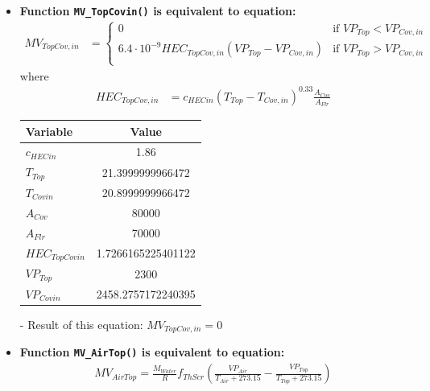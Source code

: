 \documentclass[a4paper]{article}
\numberwithin{equation}{section}
\begin{document}
\begin{itemize}
  \item \textbf{Function \texttt{MV\_TopCovin()} is equivalent to equation:}
        \begin{align*}
          MV_{TopCov,in} & = \begin{cases}
            0                                                         & \text{if~} VP_{Top} < VP_{Cov,in} \\
            6.4 \cdot 10^{-9} HEC_{TopCov,in}(VP_{Top} - VP_{Cov,in}) & \text{if~} VP_{Top} > VP_{Cov,in} \\
          \end{cases}
        \end{align*}
        where
        \begin{align*}
          HEC_{TopCov,in} & = {c_{HECin} (T_{Top} - T_{Cov,in})}^{0.33} \frac{A_{Cov}}{A_{Flr}}
        \end{align*}

        \begin{table}[H]
          \centering
          \begin{tabular}{@{}lS[table-format=4.17]@{}}
            \toprule
            \textbf{Variable}  & \textbf{Value}     \\
            \midrule
            \( c_{HECin} \)      & 1.86               \\
            \( T_{Top} \)        & 21.3999999966472   \\
            \( T_{Covin} \)      & 20.8999999966472   \\
            \( A_{Cov} \)        & 80000              \\
            \( A_{Flr} \)        & 70000              \\
            \( HEC_{TopCovin} \) & 1.7266165225401122 \\
            \( VP_{Top} \)       & 2300               \\
            \( VP_{Covin} \)     & 2458.2757172240395 \\
            \bottomrule
          \end{tabular}
        \end{table}

  \item[-] Result of this equation: \( MV_{TopCov,in} = 0 \)

  \item \textbf{Function \texttt{MV\_AirTop()} is equivalent to equation:}
        \begin{align*}
          MV_{AirTop}  = \frac{M_{Water}}{R} f_{ThScr} (\frac{VP_{Air}}{T_{Air} + 273.15} - \frac{VP_{Top}}{T_{Top} + 273.15})
        \end{align*}


\end{itemize}
\end{document}
